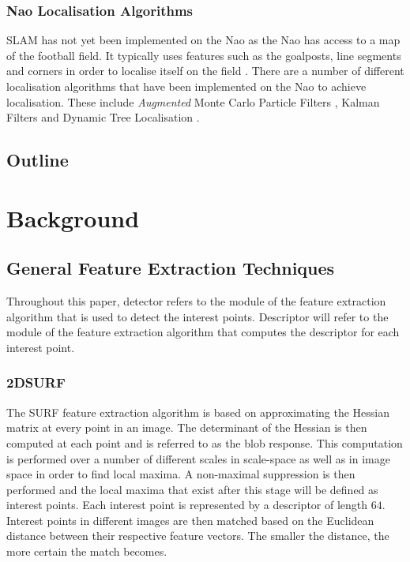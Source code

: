 \documentclass{report}
\begin{document}
\subsection{Nao Localisation Algorithms}
\label{sec:introNaoLocalise}
SLAM has not yet been implemented on the Nao as the Nao has access to a map of the football field. It typically uses features such as the goalposts, line segments and corners in order to localise itself on the field \cite{Bhuman}. There are a number of different localisation algorithms that have been implemented on the Nao to achieve localisation. These include \textit{Augmented} Monte Carlo Particle Filters \cite{Laue}, Kalman Filters and Dynamic Tree Localisation \cite{Team2012}.\\


\section{Outline}
\label{sec:outline}




\chapter{Background}
\label{sec:background}

\section{General Feature Extraction Techniques}
\label{sec:genFeatureExtract}

Throughout this paper, detector refers to the module of the feature extraction algorithm that is used to detect the interest points. Descriptor will refer to the module of the feature extraction algorithm that computes the descriptor for each interest point.\\


\subsection{2DSURF}
\label{sec:2dsurf}
The SURF feature extraction algorithm is based on approximating the Hessian matrix at every point in an image. The determinant of the Hessian is then computed at each point and is referred to as the blob response. This computation is performed over a number of different scales in scale-space as well as in image space in order to find local maxima. A non-maximal suppression is then performed and the local maxima that exist after this stage will be defined as interest points. Each interest point is represented by a descriptor of length $64$. Interest points in different images are then matched based on the Euclidean distance between their respective feature vectors. The smaller the distance, the more certain the match becomes. 
\end{document}
